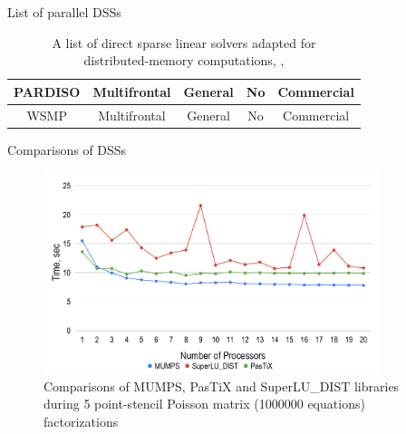 \begin{frame}[t]{List of parallel DSSs}
\begin{table}[!ht]
\begin{tabular}{|c|c|c|c|c|}
    		PARDISO         & Multifrontal       & General                      & No              & Commercial   \\ \hline
    		
    		WSMP         & Multifrontal       & General                      & No              & Commercial   \\ \hline
    	\end{tabular}
    	\caption{A list of direct sparse linear solvers adapted for \\distributed-memory computations, \cite{list-of-sparse-direct-solvers}, \cite{petsc-web-page}}
    	
    	\label{table:mm-library-spec}
    \end{table}
\end{frame}


\begin{frame}[t]{Comparisons of DSSs}
	\begin{figure}[!h]
		\centering
		\includegraphics[width=0.875\textwidth]{figures/chapter-2/solvers-comparison-5-point-stencil.png}
		\caption{Comparisons of MUMPS, PasTiX and SuperLU\_DIST libraries during 5 point-stencil Poisson matrix (1000000  equations) factorizations
		}
		\label{fig:5-point-stencil-solvers-comparison}
	\end{figure}
\end{frame}